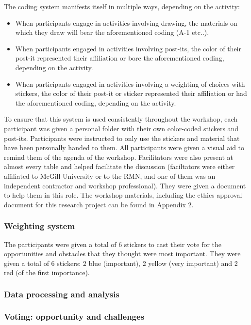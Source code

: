 The coding system manifests itself in multiple ways, depending on the activity:
\begin{itemize}
\item When participants engage in activities involving drawing, the materials on which they draw will bear the aforementioned coding (A-1 etc..).
\item When participants engaged in activities involving post-its, the color of their post-it represented their affiliation or bore the aforementioned coding, depending on the activity.
\item When participants engaged in activities involving a weighting of choices with stickers, the color of their post-it or sticker represented their affiliation or had the aforementioned coding, depending on the activity.
\end{itemize}

To ensure that this system is used consistently throughout the workshop, each participant was given a personal folder with their own color-coded stickers and post-its. Participants were instructed to only use the stickers and material that have been personally handed to them. All participants were given a visual aid to remind them of the agenda of the workshop. Facilitators were also present at almost every table and helped facilitate the discussion (faciltators were either affiliated to McGill University or to the RMN, and one of them was an independent contractor and workshop professional). They were given a document to help them in this role. The workshop materials, including the ethics approval document for this research project can be found in Appendix 2.\\

\subsubsection*{Weighting system}

The participants were given a total of 6 stickers to cast their vote for the opportunities and obstacles that they thought were most important. They were given a total of 6 stickers: 2 blue (important), 2 yellow (very important) and 2 red (of the first importance).\\

\subsubsection{Data processing and analysis}

\subsubsection*{Voting: opportunity and challenges}

